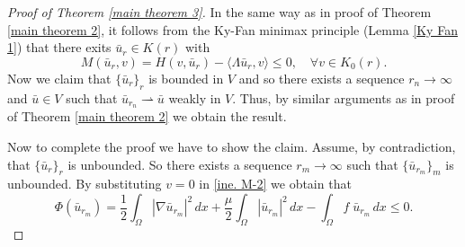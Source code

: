 \documentclass[reqno]{amsart}
\begin{document}
\begin{proof}[Proof of Theorem \ref{main theorem 3}]
In the same way as in proof of Theorem \ref{main theorem 2}, it follows from  the
Ky-Fan minimax principle (Lemma \ref{Ky Fan 1}) that there exits
\( \bar{u}_r\in K(r)\) with
\begin{equation}\label{ine. M-2}
 M(\bar{u}_r,v)=H(v, \bar{u}_r) -\langle\Lambda \bar{u}_r,v \rangle \leq 0,\quad
 \forall v\in K_0(r).
\end{equation}
Now we claim that \(\{\bar{u}_r\}_r\) is bounded in \(V\) and so there exists a sequence
\(r_n \to\infty\) and \(\bar{u}\in V\)  such that \(\bar{u}_{r_n}\rightharpoonup \bar{u}\) weakly in \(V\).
Thus, by similar arguments as in proof of Theorem \ref{main theorem 2} we obtain the
result.

Now  to complete the proof we have to show the claim.
Assume, by contradiction, that \(\{\bar{u}_r\}_r\) is unbounded. So  there exists a
sequence \(r_m \to\infty\)  such that \(\{\bar{u}_{r_m}\}_m\) is unbounded.
By substituting \(v=0\)  in  \eqref{ine. M-2} we obtain that
\begin{equation}\label{claim 1}
 \Phi(\bar{u}_{r_m})=  \frac{1}{2}\int_{\Omega} |\nabla \bar{u}_{r_m}|^2\,dx
 +\frac{\mu}{2}\int_\Omega   |\bar{u}_{r_m}|^{2}\,dx
 -\int_{\Omega} f\;\bar{u}_{r_m}\,dx\leq0.
\end{equation}


\end{proof}
\end{document}
